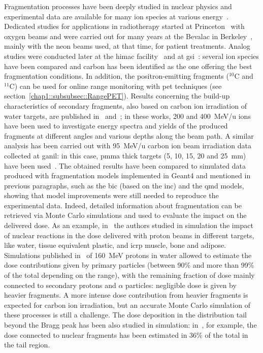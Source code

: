 Fragmentation processes have been deeply studied in nuclear physics and experimental data are available for many ion species at various energy~\parencite{Friedlander1982}. Dedicated studies for applications in radiotherapy started at Princeton~\parencite{MacCabee1974} with oxygen beams and were carried out for many years at the Bevalac in Berkeley~\parencite{Schimmerling1983, Schimmerling1989, Llacer1984, Llacer1990}, mainly with the neon beams used, at that time, for patient treatments. Analog studies were conducted later at the \gls{himac} facility~\parencite{Matsufuji2003, Matsufuji2005} and at \gls{gsi}~\parencite{Schall1996, Golovkov1997}: several ion species have been compared and carbon has been identified as the one offering the best fragmentation conditions. In addition, the positron-emitting fragments ($^{10}$C and $^{11}$C) can be used for online range monitoring with \gls{pet} techniques (see section~\ref{chap1::subsubsec::RangePET}). Results concerning the build-up characteristics of secondary fragments, also based on carbon ion irradiation of water targets, are published in~\cite{Haettner2006} and~\cite{Haettner2013}; in these works, 200 and 400~MeV/u ions have been used to investigate energy spectra and yields of the produced fragments at different angles and various depths along the beam path. A similar analysis has been carried out with 95~MeV/u carbon ion beam irradiation data collected at \gls{ganil}: in this case, \gls{pmma} thick targets (5, 10, 15, 20 and 25~mm) have been used~\parencite{Braunn2010, Braunn2011}. The obtained results have been compared to simulated data produced with fragmentation models implemented in Geant4 and mentioned in previous paragraphs, such as the \gls{bic} (based on the \gls{inc}) and the \gls{qmd} models, showing that model improvements were still needed to reproduce the experimental data.
Indeed, detailed information about fragmentation can be retrieved via Monte Carlo simulations and used to evaluate the impact on the delivered dose. As an example, in~\cite{Wroe2005} the authors studied in simulation the impact of nuclear reactions in the dose delivered with proton beams in different targets, like water, tissue equivalent plastic, and \gls{icrp} muscle, bone and adipose. Simulations published in~\parencite{Grassberger2011} of 160~MeV protons in water allowed to estimate the dose contributions given by primary particles (between 90\% and more than 99\% of the total depending on the range), with the remaining fraction of dose mainly connected to secondary protons and $\alpha$ particles: negligible dose is given by heavier fragments. A more intense dose contribution from heavier fragments is expected for carbon ion irradiation, but an accurate Monte Carlo simulation of these processes is still a challenge. The dose deposition in the distribution tail beyond the Bragg peak has been also studied in simulation: in~\cite{Francis2014}, for example, the dose connected to nuclear fragments has been estimated in 36\% of the total in the tail region. 

